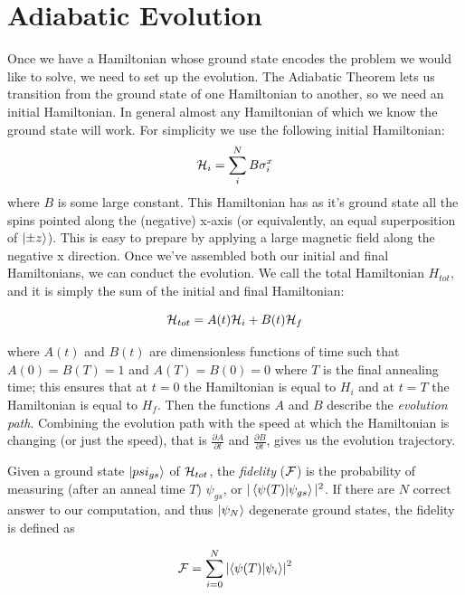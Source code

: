 \section{Adiabatic Evolution}
Once we have a Hamiltonian whose ground state encodes the problem we would like to solve, we need to set up the evolution.  The Adiabatic Theorem lets us transition from the ground state of one Hamiltonian to another, so we need an initial Hamiltonian.  In general almost any Hamiltonian of which we know the ground state will work.  For simplicity we use the following initial Hamiltonian:
\begin{equation}
	\mathcal{H}_i = \sum_i^N B \sigma_i^x
\end{equation}
where $B$ is some large constant.  This Hamiltonian has as it's ground state all the spins pointed along the (negative) x-axis (or equivalently, an equal superposition of $\mathinner{|{\pm z}\rangle}$).  This is easy to prepare by applying a large magnetic field along the negative x direction.
Once we've assembled both our initial and final Hamiltonians, we can conduct the evolution.  We call the total Hamiltonian $H_{tot}$, and it is simply the sum of the initial and final Hamiltonian:

\begin{equation}
	\mathcal{H}_{tot} = A(t)\mathcal{H}_i + B(t)\mathcal{H}_f
\end{equation}

where $A(t)$ and $B(t)$ are dimensionless functions of time such that $A(0) = B(T) = 1$ and $A(T) = B(0) = 0$ where $T$ is the final annealing time; this ensures that at $t = 0$ the Hamiltonian is equal to $H_i$ and at $t = T$ the Hamiltonian is equal to $H_f$.  Then the functions $A$ and $B$ describe the \emph{evolution path}.  Combining the evolution path with the speed at which the Hamiltonian is changing (or just the speed), that is $\frac{\partial A}{\partial t}$ and $\frac{\partial B}{\partial t}$, gives us the evolution trajectory.  

Given a ground state $\mathinner{|{psi_{gs}}\rangle}$ of $\mathcal{H}_{tot}$, the \emph{fidelity} ($\mathcal{F}$) is the probability of measuring (after an anneal time $T$) $\psi_{gs}$, or $|\mathinner{\langle{\psi(T)|\psi_{gs}}\rangle}|^2$.  If there are $N$ correct answer to our computation, and thus $\mathinner{|{\psi_N}\rangle}$ degenerate ground states, the fidelity is defined as

\begin{equation}
	\mathcal{F} = \sum_{i=0}^N \left| \mathinner{\langle{\psi(T)|\psi_i}\rangle} \right|^2
\end{equation}

